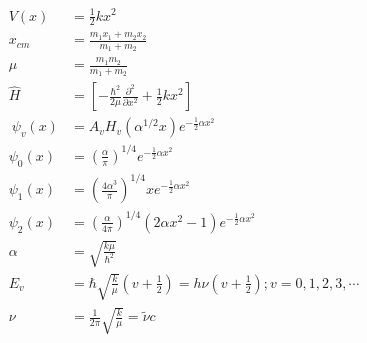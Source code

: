 \begin{align*}
V\left(x\right)&=\frac{1}{2}kx^2\\
x_{cm}&=\frac{m_1x_1+m_2x_2}{m_1+m_2}\\
\mu&=\frac{m_1m_2}{m_1+m_2}\\
\hat{H}&=\left[-\frac{\hbar^2}{2\mu} \frac{\partial^2}{\partial x^2}+ \frac{1}{2}kx^2\right]\\\
\psi_v\left(x\right)&=A_vH_v\left(\alpha^{1/2}x\right)e^{-\frac{1}{2}\alpha x^2}\\
\psi_0\left(x\right)&=\left(\frac{\alpha}{\pi}\right)^{1/4}e^{-\frac{1}{2}\alpha x^2}\\
\psi_1\left(x\right)&=\left(\frac{4\alpha^3}{\pi}\right)^{1/4}xe^{-\frac{1}{2}\alpha x^2}\\
\psi_2\left(x\right)&=\left(\frac{\alpha}{4\pi}\right)^{1/4}\left(2\alpha x^2-1\right)e^{-\frac{1}{2}\alpha x^2}\\
\alpha&=\sqrt{\frac{k\mu}{\hbar^2}}\\
E_v&=\hbar\sqrt{\frac{k}{\mu}}\left(v+\frac{1}{2}\right)=h\nu\left(v+\frac{1}{2}\right); v = 0, 1, 2, 3, \cdots\\
\nu&=\frac{1}{2\pi}\sqrt{\frac{k}{\mu}}=\tilde{\nu}c\\
\end{align*}

